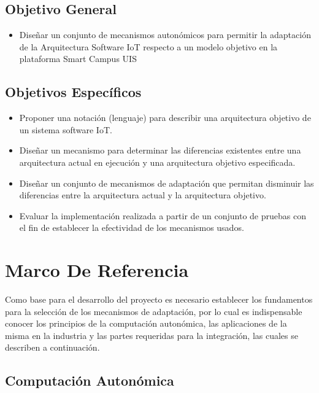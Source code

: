 \documentclass[12pt]{article}
\begin{document}
    \subsection{Objetivo General}
    \begin{itemize}

        \item Diseñar un conjunto de mecanismos autonómicos para permitir la adaptación de la Arquitectura Software IoT respecto a un modelo objetivo en la plataforma Smart Campus UIS

    \end{itemize}

    \subsection{Objetivos Específicos}

    \begin{itemize}
        \item Proponer una notación (lenguaje) para describir una arquitectura objetivo de un sistema software IoT.
        \item Diseñar un mecanismo para determinar las diferencias existentes entre una arquitectura actual en ejecución y una arquitectura objetivo especificada.
        \item Diseñar un conjunto de mecanismos de adaptación que permitan disminuir las diferencias entre la arquitectura actual y la arquitectura objetivo.
        \item Evaluar la implementación realizada a partir de un conjunto de pruebas con el fin de establecer la efectividad de los mecanismos usados.

    \end{itemize}


    \section{Marco De Referencia}

    Como base para el desarrollo del proyecto es necesario establecer los fundamentos para la selección de los mecanismos de adaptación, por lo cual es indispensable conocer los principios de la computación autonómica, las aplicaciones de la misma en la industria y las partes requeridas para la integración, las cuales se describen a continuación.

    \subsection{Computación Autonómica}
    
\end{document}
